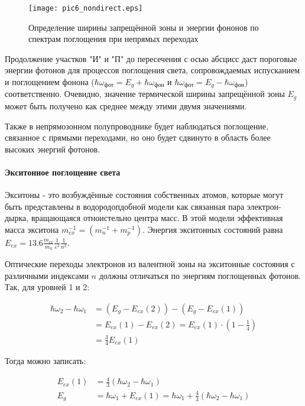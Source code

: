 \begin{figure}[h!]\centering
\texttt{[image: pic6\_nondirect.eps]}
\caption{Определение ширины запрещённой зоны и энергии фононов по спектрам поглощения при непрямых переходах}
\label{pic6_nondirect}
\end{figure}

Продолжение участков "И" и "П" до пересечения с осью абсцисс даст пороговые энергии фотонов для процессов поглощения света, сопровождаемых испусканием и поглощением фонона ($\hbar \omega_{\text{фот}} = E_{g} + \hbar \omega_{\text{фон}}$ и $\hbar \omega_{\text{фот}} = E_{g} - \hbar \omega_{\text{фон}}$) соответственно. Очевидно, значение термической ширины запрещённой зоны $E_{g}$ может быть получено как среднее между этими двумя значениями.

Также в непрямозонном полупроводнике будет наблюдаться поглощение, связанное с прямыми переходами, но оно будет сдвинуто в область более высоких энергий фотонов.

\paragraph{Экситонное поглощение света}
Экситоны - это возбуждённые состояния собственных атомов, которые могут быть представлены в водородопдобной модели как связанная пара электрон-дырка, вращающаяся отноистельно центра масс. В этой модели эффективная масса экситона $m_{ex}^{-1} = (m_{n}^{-1} + m_{p}^{-1})$. Энергия экситонных состояний равна $E_{ex} = 13.6 \frac{m_{ex}}{m_{0}} \frac{1}{\varepsilon^2} \frac{1}{n^2}$.

Оптические переходы электронов из валентной зоны на экситонные состояния с различными индексами $n$ должны отличаться по энергиям поглощенных фотонов. Так, для уровней 1 и 2:

\begin{equation}
\begin{split}
\hbar \omega_{2} - \hbar \omega_{1} &= \left( E_{g} - E_{ex}(2) \right) - \left( E_{g} - E_{ex}(1) \right) \\
&= E_{ex}(1) -  E_{ex}(2) =  E_{ex}(1) \cdot \left( 1 - \frac{1}{4} \right) \\
&= \frac{3}{4} E_{ex}(1)
\end{split}
\end{equation}

Тогда можно записать:

\begin{equation}
\begin{split}
E_{ex}(1) &= \frac{4}{3} (\hbar \omega_{2} - \hbar \omega_{1}) \\
E_{g} &= \hbar \omega_{1} + E_{ex}(1) = \hbar \omega_{1} + \frac{4}{3} (\hbar \omega_{2} - \hbar \omega_{1})
\end{split}
\end{equation}

